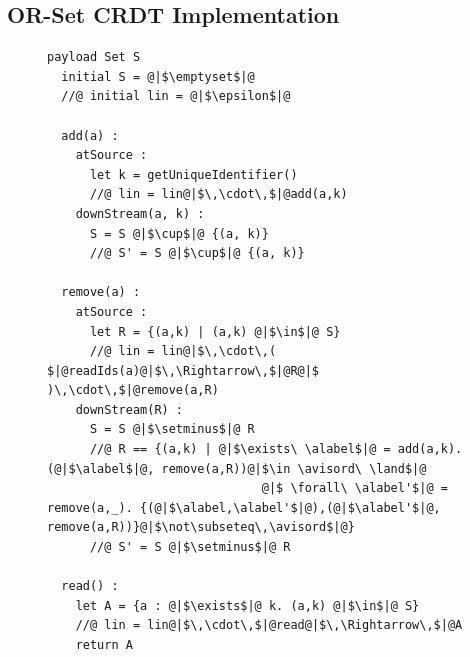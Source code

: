 

\subsection{OR-Set CRDT Implementation}
\label{sec:or-set-crdt}

\begin{figure}[!t]
  \centering
\begin{lstlisting}[caption={Pseudo-code of the OR-Set CRDT.},basicstyle=\ttfamily\scriptsize,captionpos=b,label={lst:or-set}]
  payload Set S
  initial S = @|$\emptyset$|@
  //@ initial lin = @|$\epsilon$|@

  add(a) :
    atSource :
      let k = getUniqueIdentifier()
      //@ lin = lin@|$\,\cdot\,$|@add(a,k)
    downStream(a, k) :
      S = S @|$\cup$|@ {(a, k)}
      //@ S' = S @|$\cup$|@ {(a, k)}

  remove(a) :
    atSource :
      let R = {(a,k) | (a,k) @|$\in$|@ S}
      //@ lin = lin@|$\,\cdot\,( $|@readIds(a)@|$\,\Rightarrow\,$|@R@|$ )\,\cdot\,$|@remove(a,R)
    downStream(R) :
      S = S @|$\setminus$|@ R
      //@ R == {(a,k) | @|$\exists\ \alabel$|@ = add(a,k). (@|$\alabel$|@, remove(a,R))@|$\in \avisord\ \land$|@
                              @|$ \forall\ \alabel'$|@ = remove(a,_). {(@|$\alabel,\alabel'$|@),(@|$\alabel'$|@, remove(a,R))}@|$\not\subseteq\,\avisord$|@}
      //@ S' = S @|$\setminus$|@ R

  read() :
    let A = {a : @|$\exists$|@ k. (a,k) @|$\in$|@ S}
    //@ lin = lin@|$\,\cdot\,$|@read@|$\,\Rightarrow\,$|@A
    return A
\end{lstlisting}
\end{figure}

